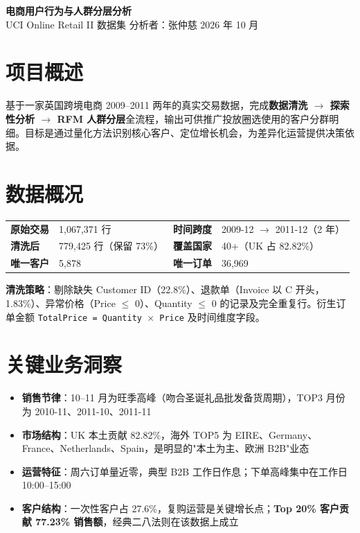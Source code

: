 \documentclass[10pt,a4paper,fontset=windows]{ctexart}
\begin{document}
\begin{center}
    {\LARGE\bfseries\color{maincolor} 电商用户行为与人群分层分析}\\[3pt]
    {\color{subcolor} UCI Online Retail II 数据集 \textbar{} 分析者：张仲慈 \textbar{} 2026 年 10 月}
\end{center}

\vspace{4pt}

\section*{项目概述}

基于一家英国跨境电商 2009--2011 两年的真实交易数据，完成\textbf{数据清洗 $\to$ 探索性分析 $\to$ RFM 人群分层}全流程，输出可供推广投放圈选使用的客户分群明细。目标是通过量化方法识别核心客户、定位增长机会，为差异化运营提供决策依据。

\section*{数据概况}

\begin{tabular}{@{}p{3.2cm}p{4.5cm}p{3.2cm}p{5.5cm}@{}}
    \textbf{原始交易} & 1{,}067{,}371 行 & \textbf{时间跨度} & 2009-12 $\to$ 2011-12（2 年） \\
    \textbf{清洗后} & 779{,}425 行（保留 73\%） & \textbf{覆盖国家} & 40+（UK 占 82.82\%） \\
    \textbf{唯一客户} & 5{,}878 & \textbf{唯一订单} & 36{,}969 \\
\end{tabular}

\textbf{清洗策略}：剔除缺失 Customer ID（22.8\%）、退款单（Invoice 以 C 开头，1.83\%）、异常价格（Price $\le$ 0）、Quantity $\le$ 0 的记录及完全重复行。衍生订单金额 \texttt{TotalPrice = Quantity $\times$ Price} 及时间维度字段。

\section*{关键业务洞察}

\begin{itemize}
    \item \textbf{销售节律}：10--11 月为旺季高峰（吻合圣诞礼品批发备货周期），TOP3 月份为 2010-11、2011-10、2011-11
    \item \textbf{市场结构}：UK 本土贡献 82.82\%，海外 TOP5 为 EIRE、Germany、France、Netherlands、Spain，是明显的"本土为主、欧洲 B2B"业态
    \item \textbf{运营特征}：周六订单量近零，典型 B2B 工作日作息；下单高峰集中在工作日 10:00--15:00
    \item \textbf{客户结构}：一次性客户占 27.6\%，复购运营是关键增长点；\textbf{Top 20\% 客户贡献 77.23\% 销售额}，经典二八法则在该数据上成立
\end{itemize}
\end{document}
